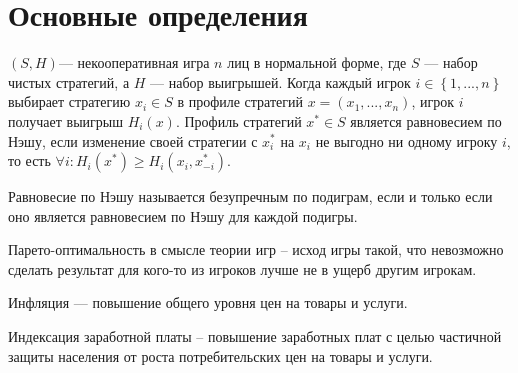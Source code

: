 \section{Основные определения}

\begin{definition}	$(S,H)$— некооперативная игра $n$ лиц в нормальной форме, где $S$ — набор чистых стратегий, а $H$ — набор выигрышей. Когда каждый игрок $i \in \left\{1,...,n\right\}$  выбирает стратегию $x_i \in S$  в профиле стратегий $x=(x_1,...,x_n)$, игрок $i$  получает выигрыш $H_i(x)$. Профиль стратегий $x^* \in S$   является равновесием по Нэшу, если изменение своей стратегии с $x_i^*$  на $x_i$  не выгодно ни одному игроку $i$, то есть $\forall i : H_i(x^*) \ge H_i(x_i, x_{-i}^*)$.
\end{definition}
	
\begin{definition}
Равновесие по Нэшу называется безупречным по подиграм, если и только если оно является равновесием по Нэшу для каждой подигры.
\end{definition}

\begin{definition}
Парето-оптимальность в смысле теории игр – исход игры такой, что невозможно сделать результат для кого-то из игроков лучше не в ущерб другим игрокам. 
\end{definition}

\begin{definition}
	Инфляция  — повышение общего уровня цен на товары и услуги.
\end{definition}

\begin{definition}
	Индексация заработной платы – повышение заработных плат с целью частичной защиты населения от роста потребительских цен на товары и услуги.
\end{definition}